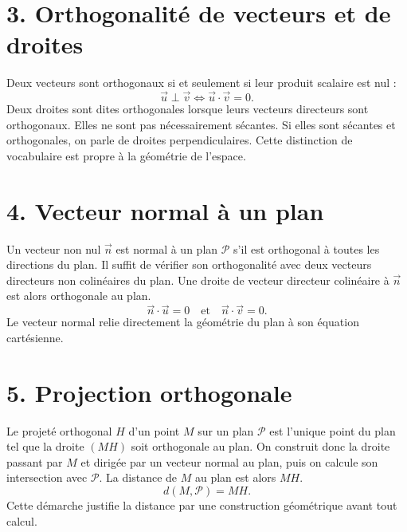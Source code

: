 
\section{3. Orthogonalité de vecteurs et de droites}
Deux vecteurs sont orthogonaux si et seulement si leur produit scalaire est nul :
\[
\vec u\perp\vec v\Longleftrightarrow \vec u\cdot\vec v=0.
\]
Deux droites sont dites orthogonales lorsque leurs vecteurs directeurs sont orthogonaux. Elles ne sont pas nécessairement sécantes. Si elles sont sécantes et orthogonales, on parle de droites perpendiculaires. Cette distinction de vocabulaire est propre à la géométrie de l'espace.

\section{4. Vecteur normal à un plan}
Un vecteur non nul $\vec n$ est normal à un plan $\mathcal P$ s'il est orthogonal à toutes les directions du plan. Il suffit de vérifier son orthogonalité avec deux vecteurs directeurs non colinéaires du plan. Une droite de vecteur directeur colinéaire à $\vec n$ est alors orthogonale au plan.
\[
\vec n\cdot\vec u=0\quad\text{et}\quad\vec n\cdot\vec v=0.
\]
Le vecteur normal relie directement la géométrie du plan à son équation cartésienne.

\section{5. Projection orthogonale}
Le projeté orthogonal $H$ d'un point $M$ sur un plan $\mathcal P$ est l'unique point du plan tel que la droite $(MH)$ soit orthogonale au plan. On construit donc la droite passant par $M$ et dirigée par un vecteur normal au plan, puis on calcule son intersection avec $\mathcal P$. La distance de $M$ au plan est alors $MH$.
\[
d(M,\mathcal P)=MH.
\]
Cette démarche justifie la distance par une construction géométrique avant tout calcul.


